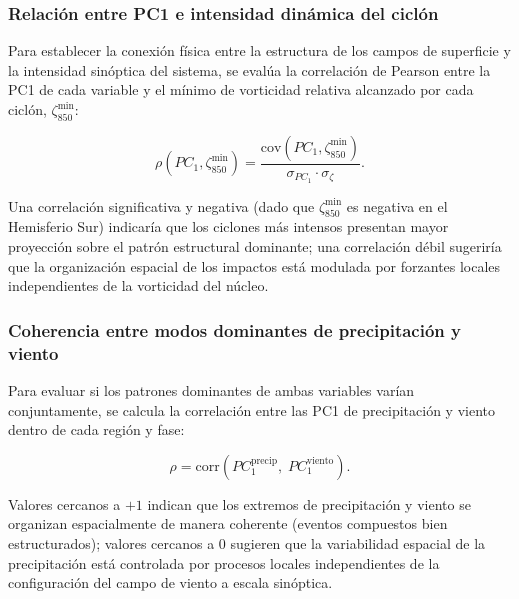 \subsubsection{Relación entre PC1 e intensidad dinámica del ciclón}\label{subsubsec:pc1_vorticidad}

Para establecer la conexión física entre la estructura de los campos de superficie y la intensidad sinóptica del sistema, se evalúa la correlación de Pearson entre la PC1 de cada variable y el mínimo de vorticidad relativa alcanzado por cada ciclón, $\zeta_{850}^{\min}$:

\begin{equation}
    \rho\!\left(PC_1, \zeta_{850}^{\min}\right) = \frac{\text{cov}\!\left(PC_1, \zeta_{850}^{\min}\right)}{\sigma_{PC_1} \cdot \sigma_{\zeta}}.
\end{equation}

Una correlación significativa y negativa (dado que $\zeta_{850}^{\min}$ es negativa en el Hemisferio Sur) indicaría que los ciclones más intensos presentan mayor proyección sobre el patrón estructural dominante; una correlación débil sugeriría que la organización espacial de los impactos está modulada por forzantes locales independientes de la vorticidad del núcleo.

\subsubsection{Coherencia entre modos dominantes de precipitación y viento}\label{subsubsec:coherencia_pc1}

Para evaluar si los patrones dominantes de ambas variables varían conjuntamente, se calcula la correlación entre las PC1 de precipitación y viento dentro de cada región y fase:

\begin{equation}
    \rho = \text{corr}\!\left(PC_1^{\text{precip}},\; PC_1^{\text{viento}}\right).
\end{equation}

Valores cercanos a $+1$ indican que los extremos de precipitación y viento se organizan espacialmente de manera coherente (eventos compuestos bien estructurados); valores cercanos a $0$ sugieren que la variabilidad espacial de la precipitación está controlada por procesos locales independientes de la configuración del campo de viento a escala sinóptica.

 
